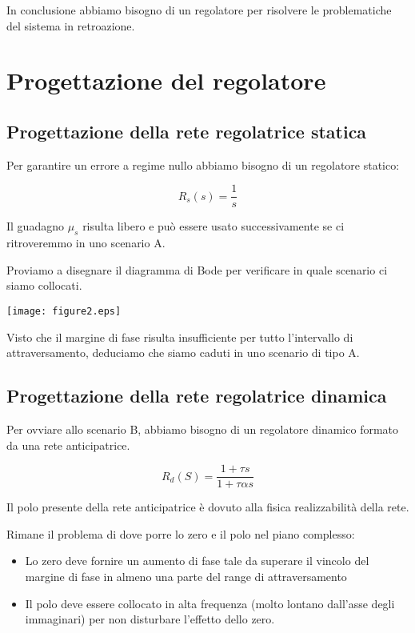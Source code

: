 \documentclass{article}
\begin{document}
In conclusione abbiamo bisogno di un regolatore per risolvere le problematiche del sistema in retroazione.

\section{Progettazione del regolatore}

\subsection{Progettazione della rete regolatrice statica}

Per garantire un errore a regime nullo abbiamo bisogno di un regolatore statico:

$$
R_s(s)=\frac{1}{s}
$$

Il guadagno $\mu_s$ risulta libero e può essere usato successivamente se ci ritroveremmo in uno scenario A.

Proviamo a disegnare il diagramma di Bode per verificare in quale scenario ci siamo collocati.

\begin{center}
    \texttt{[image: figure2.eps]}
\end{center}

Visto che il margine di fase risulta insufficiente per tutto l'intervallo di attraversamento, deduciamo che siamo caduti in uno scenario di tipo A.

\subsection{Progettazione della rete regolatrice dinamica}

Per ovviare allo scenario B, abbiamo bisogno di un regolatore dinamico formato da una rete anticipatrice.

$$
R_d(S)=\frac{1+\tau s}{1+\tau \alpha s}
$$

Il polo presente della rete anticipatrice è dovuto alla fisica realizzabilità della rete.

Rimane il problema di dove porre lo zero e il polo nel piano complesso:
\begin{itemize}
    \item Lo zero deve fornire un aumento di fase tale da superare il vincolo del margine di fase in almeno una parte del range di attraversamento
    \item Il polo deve essere collocato in alta frequenza (molto lontano dall'asse degli immaginari) per non disturbare l'effetto dello zero.
\end{itemize}
\end{document}
